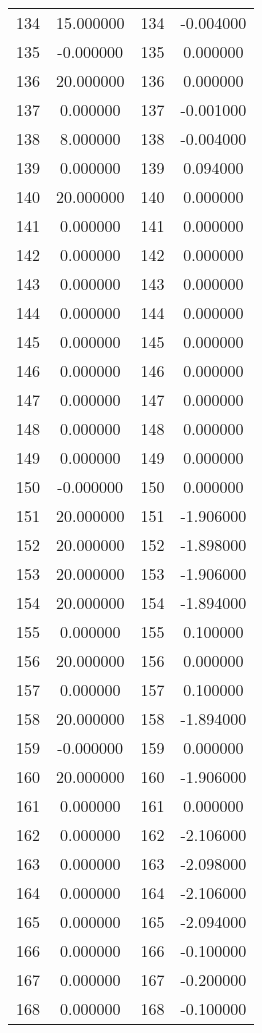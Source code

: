 \documentclass[12pt]{article}
\begin{document}
\begin{longtable}{@{}cccc@{}}
134 & 15.000000 & 134 & -0.004000 \\
135 & -0.000000 & 135 & 0.000000 \\
136 & 20.000000 & 136 & 0.000000 \\
137 & 0.000000 & 137 & -0.001000 \\
138 & 8.000000 & 138 & -0.004000 \\
139 & 0.000000 & 139 & 0.094000 \\
140 & 20.000000 & 140 & 0.000000 \\
141 & 0.000000 & 141 & 0.000000 \\
142 & 0.000000 & 142 & 0.000000 \\
143 & 0.000000 & 143 & 0.000000 \\
144 & 0.000000 & 144 & 0.000000 \\
145 & 0.000000 & 145 & 0.000000 \\
146 & 0.000000 & 146 & 0.000000 \\
147 & 0.000000 & 147 & 0.000000 \\
148 & 0.000000 & 148 & 0.000000 \\
149 & 0.000000 & 149 & 0.000000 \\
150 & -0.000000 & 150 & 0.000000 \\
151 & 20.000000 & 151 & -1.906000 \\
152 & 20.000000 & 152 & -1.898000 \\
153 & 20.000000 & 153 & -1.906000 \\
154 & 20.000000 & 154 & -1.894000 \\
155 & 0.000000 & 155 & 0.100000 \\
156 & 20.000000 & 156 & 0.000000 \\
157 & 0.000000 & 157 & 0.100000 \\
158 & 20.000000 & 158 & -1.894000 \\
159 & -0.000000 & 159 & 0.000000 \\
160 & 20.000000 & 160 & -1.906000 \\
161 & 0.000000 & 161 & 0.000000 \\
162 & 0.000000 & 162 & -2.106000 \\
163 & 0.000000 & 163 & -2.098000 \\
164 & 0.000000 & 164 & -2.106000 \\
165 & 0.000000 & 165 & -2.094000 \\
166 & 0.000000 & 166 & -0.100000 \\
167 & 0.000000 & 167 & -0.200000 \\
168 & 0.000000 & 168 & -0.100000 \\

\end{longtable}
\end{document}
